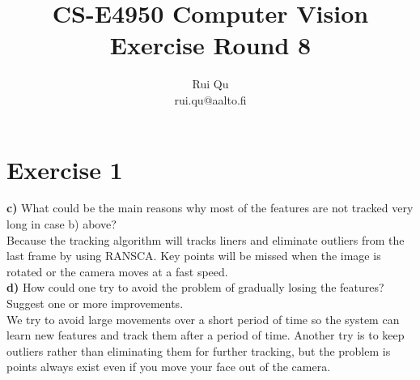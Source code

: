 \documentclass{article}
\begin{document}
\title{CS-E4950 Computer Vision\\Exercise Round 8}                  
\author{Rui Qu\\rui.qu@aalto.fi}
\maketitle



\section*{Exercise 1}



\textbf{c)} What could be the main reasons why most of the features are not tracked very long in case b) above?\\

Because the tracking algorithm will tracks liners and eliminate outliers from the last frame by using RANSCA. Key points will be missed when the image is rotated or the camera moves at a fast speed.\\

\textbf{d)} How could one try to avoid the problem of gradually losing the features? Suggest one or more improvements.\\

We try to avoid large movements over a short period of time so the system can learn new features and track them after a period of time.  Another try is to keep outliers rather than eliminating them for further tracking, but the problem is points always exist even if you move your face out of the camera. \\
\end{document}
